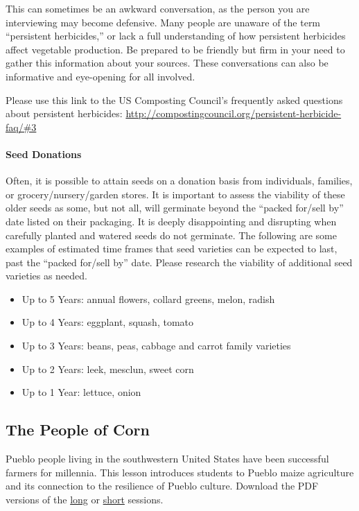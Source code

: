 \documentclass[12pt,]{article}
\providecommand{\tightlist}{%
  \setlength{\itemsep}{0pt}\setlength{\parskip}{0pt}}
\let\oldparagraph\paragraph
\renewcommand{\paragraph}[1]{\oldparagraph{#1}\mbox{}}
\begin{document}
This can sometimes be an awkward conversation, as the person you are interviewing may become defensive. Many people are unaware of the term ``persistent herbicides,'' or lack a full understanding of how persistent herbicides affect vegetable production. Be prepared to be friendly but firm in your need to gather this information about your sources. These conversations can also be informative and eye-opening for all involved.

Please use this link to the US Composting Council's frequently asked questions about persistent herbicides:
\url{http://compostingcouncil.org/persistent-herbicide-faq/\#3}

\hypertarget{seed-donations}{%
\paragraph{Seed Donations}\label{seed-donations}}

Often, it is possible to attain seeds on a donation basis from individuals, families, or grocery/nursery/garden stores. It is important to assess the viability of these older seeds as some, but not all, will germinate beyond the ``packed for/sell by'' date listed on their packaging. It is deeply disappointing and disrupting when carefully planted and watered seeds do not germinate. The following are some examples of estimated time frames that seed varieties can be expected to last, past the ``packed for/sell by'' date. Please research the viability of additional seed varieties as needed.

\begin{itemize}
\tightlist
\item
  Up to 5 Years: annual flowers, collard greens, melon, radish
\item
  Up to 4 Years: eggplant, squash, tomato
\item
  Up to 3 Years: beans, peas, cabbage and carrot family varieties
\item
  Up to 2 Years: leek, mesclun, sweet corn
\item
  Up to 1 Year: lettuce, onion
\end{itemize}

\hypertarget{the-people-of-corn-1}{%
\subsection{The People of Corn}\label{the-people-of-corn-1}}

Pueblo people living in the southwestern United States have been successful farmers for millennia. This lesson introduces students to Pueblo maize agriculture and its connection to the resilience of Pueblo culture. Download the PDF versions of the \href{./lessons/PFP_Lesson-1_The-People-of-Corn_Long.pdf}{long} or \href{./lessons/PFP_Lesson-1_The-People-of-Corn_Short.pdf}{short} sessions.
\end{document}
